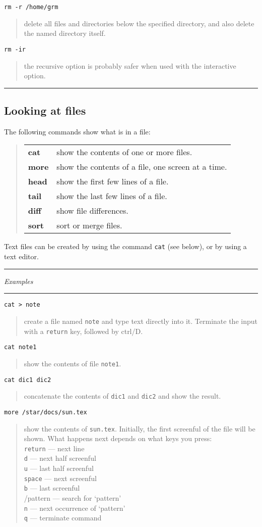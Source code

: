\documentclass[twoside,11pt]{article}
\newcommand{\example}[2]{\goodbreak
                         {\tt #1}
                         \vspace*{-4mm}
                         \begin{quote}
                           {\small #2}
                         \end{quote}
                        }
\newcommand{\example}[2]{\goodbreak
                            {\tt #1}
                            \vspace*{-4mm}
                            \begin{quote}
                            {#2}
                            \end{quote}
                           }
\newcommand{\exbegin}{\begin{center}
                      \rule{18mm}{0.3mm}
                      {\em Examples}
                      \rule{18mm}{0.3mm}
                      \end{center}
                     }
\newcommand{\exend}{\begin{center}
                    \rule{50mm}{0.3mm}
                    \end{center}
                   }
\begin{document}
\example{rm -r /home/grm}
{delete all files and directories below the specified directory, and also
delete the named directory itself.}

\example{rm -ir}
{the recursive option is probably safer when used with the interactive option.}

\exend

\subsection{Looking at files}

The following commands show what is in a file:

\begin{quote}
\begin{tabular}{lp{74mm}}

{\bf cat}  & show the contents of one or more files.\\
{\bf more} & show the contents of a file, one screen at a time.\\
{\bf head} & show the first few lines of a file.\\
{\bf tail} & show the last few lines of a file.\\
{\bf diff} & show file differences.\\
{\bf sort} & sort or merge files.

\end{tabular}
\end{quote}

Text files can be created by using the command {\tt cat} (see below), or by
using a text editor.

\goodbreak

\exbegin

\example{cat > note}
{create a file named {\tt note} and type text directly into it.
Terminate the input with a {\tt return}  key, followed by ctrl/D.}

\example{cat note1}
{show the contents of file {\tt note1}.}

\example{cat dic1 dic2}
{concatenate the contents of {\tt dic1} and {\tt dic2} and show the result.}

\example{more /star/docs/sun.tex}
{show the contents of {\tt sun.tex}.
Initially, the first screenful of the file will be shown.
What happens next depends on what keys you press:\\
{\tt return}  --- next line\\
{\tt d} --- next half screenful\\
{\tt u} --- last half screenful\\
{\tt space} --- next screenful\\
{\tt b} --- last screenful\\
/pattern --- search for `pattern'\\
{\tt n} --- next occurrence of `pattern'\\
{\tt q} --- terminate command}
\end{document}
